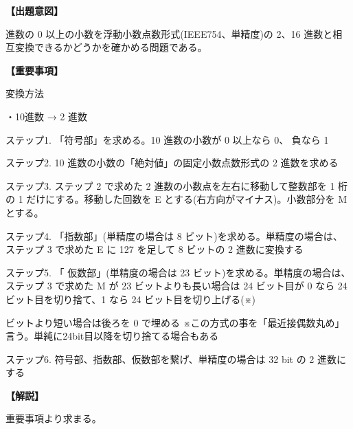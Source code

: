 \noindent \textbf{【出題意図】}

 進数の 0 以上の小数を浮動小数点数形式(IEEE754、単精度)の 2、16 進数と相互変換できるかどうかを確かめる問題である。

\vspace{1em}
\noindent \textbf{【重要事項】}

\noindent 変換方法

\medskip
\noindent ・10進数 → 2 進数

\medskip
\noindent ステップ1. 「符号部」を求める。10 進数の小数が 0 以上なら 0、 負なら 1 

\noindent ステップ2.  10 進数の小数の「絶対値」の固定小数点数形式の 2 進数を求める 

\noindent ステップ3.  ステップ 2 で求めた 2 進数の小数点を左右に移動して整数部を 1 桁の 1 だけにする。移動した回数を E とする(右方向がマイナス)。小数部分を M とする。

\noindent ステップ4.  「指数部」(単精度の場合は 8 ビット)を求める。単精度の場合は、ステップ 3 で求めた E に 127 を足して 8 ビットの 2 進数に変換する

\noindent ステップ5. 「 仮数部」(単精度の場合は 23 ビット)を求める。単精度の場合は、ステップ 3 で求めた M が 23 ビットよりも長い場合は 24 ビット目が 0 なら 24 ビット目を切り捨て、1 なら 24 ビット目を切り上げる(※)

 ビットより短い場合は後ろを 0 で埋める ※この方式の事を「最近接偶数丸め」言う。単純に24bit目以降を切り捨てる場合もある 

\noindent ステップ6.  符号部、指数部、仮数部を繋げ、単精度の場合は 32 bit の 2 進数にする


\vspace{1em}
\noindent \textbf{【解説】}

\noindent 重要事項より求まる。

